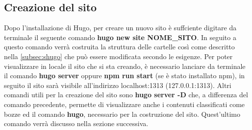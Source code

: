 \documentclass[target=bach,aauheader=]{thud}
\begin{document}
\subsection{Creazione del sito}\label{sec:creazione}
Dopo l'installazione di Hugo, per creare un nuovo sito è suffciente digitare da terminale il seguente comando \textbf{hugo new site NOME\_SITO}. 
In seguito a questo comando verrà costruita la struttura delle cartelle così come descritto nella \cref{subsec:shugo} che può essere modificata secondo le esigenze.
\newline
Per poter visualizzare in locale il sito che si sta creando, è necessario lanciare da terminale il comando \textbf{hugo server} oppure \textbf{npm run start} (se è stato installato npm), in seguito il sito sarà visibile all'indirizzo localhost:1313 (127.0.0.1:1313).
\newline
Altri comandi utili per la creazione del sito sono \textbf{hugo server -D} che, a differenza del comando precedente, permette di visualizzare anche i contenuti classificati come bozze ed il comando \textbf{hugo}, necessario per la costruzione del sito. Quest'ultimo comando verrà discusso nella sezione successiva.
\end{document}

